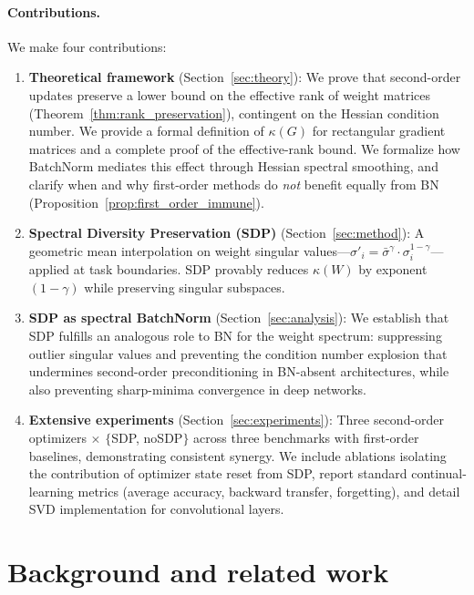 \documentclass{article}
\begin{document}
\paragraph{Contributions.} We make four contributions:
\begin{enumerate}[leftmargin=*,nosep]
    \item \textbf{Theoretical framework} (Section~\ref{sec:theory}): We prove that second-order updates preserve a lower bound on the effective rank of weight matrices (Theorem~\ref{thm:rank_preservation}), contingent on the Hessian condition number. We provide a formal definition of $\kappa(G)$ for rectangular gradient matrices and a complete proof of the effective-rank bound. We formalize how BatchNorm mediates this effect through Hessian spectral smoothing, and clarify when and why first-order methods do \emph{not} benefit equally from BN (Proposition~\ref{prop:first_order_immune}).

    \item \textbf{Spectral Diversity Preservation (SDP)} (Section~\ref{sec:method}): A geometric mean interpolation on weight singular values---$\sigma'_i = \bar{\sigma}^\gamma \cdot \sigma_i^{1-\gamma}$---applied at task boundaries. SDP provably reduces $\kappa(W)$ by exponent $(1-\gamma)$ while preserving singular subspaces.

    \item \textbf{SDP as spectral BatchNorm} (Section~\ref{sec:analysis}): We establish that SDP fulfills an analogous role to BN for the weight spectrum: suppressing outlier singular values and preventing the condition number explosion that undermines second-order preconditioning in BN-absent architectures, while also preventing sharp-minima convergence in deep networks.

    \item \textbf{Extensive experiments} (Section~\ref{sec:experiments}): Three second-order optimizers $\times$ $\{$SDP, noSDP$\}$ across three benchmarks with first-order baselines, demonstrating consistent synergy. We include ablations isolating the contribution of optimizer state reset from SDP, report standard continual-learning metrics (average accuracy, backward transfer, forgetting), and detail SVD implementation for convolutional layers.
\end{enumerate}

\section{Background and related work}
\label{sec:background}
\end{document}
